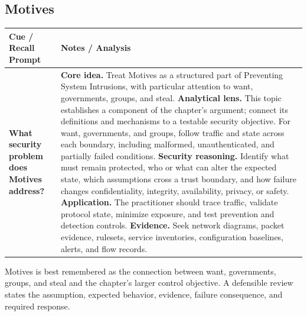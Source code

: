 \documentclass[11pt]{article}
\newcommand{\CornellHeader}{%
\rowcolor{Navy}\color{white}\bfseries Cue / Recall Prompt & \color{white}\bfseries Notes / Analysis\\\hline}
\newcommand{\CornellRow}[2]{%
\cellcolor{CueGray}\RaggedRight\textbf{#1} & \RaggedRight #2\\\hline}
\begin{document}
\subsection*{Motives}
\begin{longtable}{>{\RaggedRight\arraybackslash}p{}|>{\RaggedRight\arraybackslash}p{}}
\CornellHeader
\CornellRow{What security problem does Motives address?}{\textbf{Core idea.} Treat Motives as a structured part of Preventing System Intrusions, with particular attention to want, governments, groups, and steal. \textbf{Analytical lens.} This topic establishes a component of the chapter's argument; connect its definitions and mechanisms to a testable security objective. For want, governments, and groups, follow traffic and state across each boundary, including malformed, unauthenticated, and partially failed conditions. \textbf{Security reasoning.} Identify what must remain protected, who or what can alter the expected state, which assumptions cross a trust boundary, and how failure changes confidentiality, integrity, availability, privacy, or safety. \textbf{Application.} The practitioner should trace traffic, validate protocol state, minimize exposure, and test prevention and detection controls. \textbf{Evidence.} Seek network diagrams, packet evidence, rulesets, service inventories, configuration baselines, alerts, and flow records.}
\end{longtable}
\begin{topicsummary}
Motives is best remembered as the connection between want, governments, groups, and steal and the chapter's larger control objective. A defensible review states the assumption, expected behavior, evidence, failure consequence, and required response.
\end{topicsummary}
\end{document}
